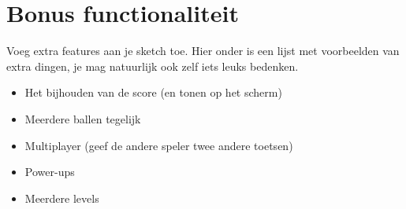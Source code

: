 \documentclass{../qh_assignment}
\begin{document}
\section{Bonus functionaliteit}
Voeg extra features aan je sketch toe. Hier onder is een lijst met voorbeelden van extra dingen, je mag natuurlijk ook zelf iets leuks bedenken.
\begin{itemize}
    \item Het bijhouden van de score (en tonen op het scherm)
    \item Meerdere ballen tegelijk
    \item Multiplayer (geef de andere speler twee andere toetsen)
    \item Power-ups
    \item Meerdere levels
\end{itemize}
\end{document}
